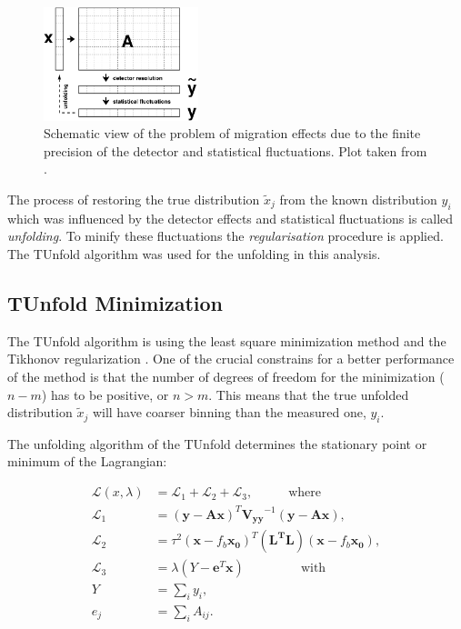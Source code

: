 \begin{figure}[t]
  \centering
  \includegraphics[width=0.4\textwidth]{06_DiffXsec/plots/d12-129f1.png}
  \caption{Schematic view of the problem of migration effects due to the finite precision of the detector and statistical 
  fluctuations. Plot taken from \cite{Schmitt:2012kp}.}
  \label{fig:scUnf}
\end{figure}

The process of restoring the true distribution $\tilde{x}_{j}$ from the known distribution $y_{i}$ which was influenced
by the detector effects and statistical fluctuations is called \textit{unfolding}. To minify these fluctuations the 
\textit{regularisation} procedure is applied. The TUnfold \cite{Schmitt:2012kp} algorithm was used for the
unfolding in this analysis.

\subsection{TUnfold Minimization}\label{ssec:TUmini}

The TUnfold algorithm is using the least square minimization method and the Tikhonov regularization \cite{Tikhonov:1963}. One of the crucial 
constrains for a better performance of the method is that the number of degrees of freedom for the minimization ($n - m$) has to be positive,
or $n > m$. This means that the true unfolded distribution $\tilde{x}_j$ will have coarser binning than the measured one, $y_{i}$.

The unfolding algorithm of the TUnfold determines the stationary point or minimum of the Lagrangian:

\begin{align}
 \mathcal{L}(x, \lambda) & = \mathcal{L}_{1} + \mathcal{L}_{2} + \mathcal{L}_{3}, \;\;\;\;\;\;\;\;\;\; \textrm{where}\\
 \mathcal{L}_{1} & = (\mathbf{y} - \mathbf{A}\mathbf{x})^{T} \mathbf{V_{yy}}^{-1}(\mathbf{y} - \mathbf{A}\mathbf{x}),\\
 \mathcal{L}_{2} & = \tau^{2}(\mathbf{x} - f_{b}\mathbf{x_{0}})^{T} (\mathbf{L^{T}L}) (\mathbf{x} - f_{b}\mathbf{x_{0}}), \\
 \mathcal{L}_{3} & = \lambda(Y -\mathbf{e}^{T}\mathbf{x}) \;\;\;\;\;\;\;\;\;\;\;\;\;\;\;\; \textrm{with} \\
 Y & = \sum_{i} y_{i}, \\
 e_{j} & = \sum_{i} A_{ij}.
\end{align}

